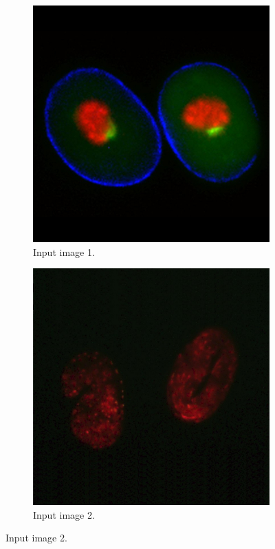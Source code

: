\documentclass[a4paper,11pt]{ijamas}
\begin{document}
\begin{figure}[!h]
\centering
\begin{subfigure}{.48\textwidth}
  \centering
  \includegraphics[width=0.80\columnwidth]{./figs/_1colr.jpg}
 \caption{Input image 1. \cite{cil:9233}}
  \label{fig:inputimage1}
\end{subfigure}%
\begin{subfigure}{.48\textwidth}
  \centering
  \includegraphics[width=0.80\columnwidth]{./figs/_3colr.jpg}
 \caption{Input image 2. \cite{cil:13902}}
  \label{fig:inputimage2}
\end{subfigure}%



\end{figure}
\end{document}

